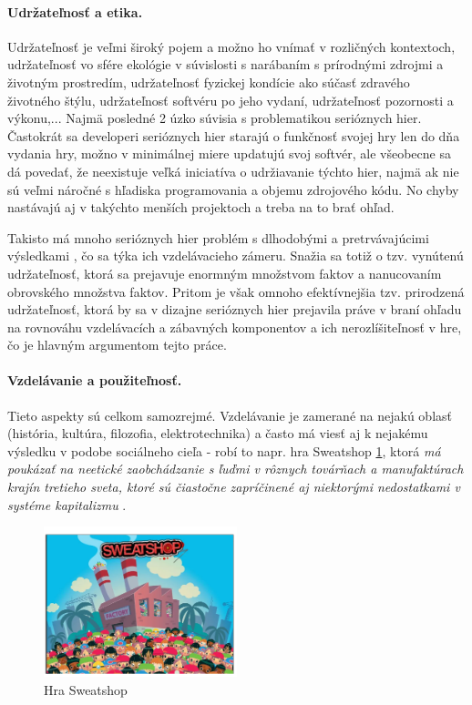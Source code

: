 \documentclass[10pt,twoside,slovak,a4paper]{article}
\begin{document}
\paragraph{Udržateľnosť a etika.} Udržateľnosť je veľmi široký pojem a možno ho vnímať v rozličných kontextoch, udržateľnosť vo sfére ekológie v súvislosti s narábaním s prírodnými zdrojmi a životným prostredím, udržateľnosť fyzickej kondície ako súčasť zdravého životného štýlu, udržateľnosť softvéru po jeho vydaní, udržateľnosť pozornosti a výkonu,... Najmä posledné 2 úzko súvisia s problematikou serióznych hier. Častokrát sa developeri serióznych hier starajú o funkčnosť svojej hry len do dňa vydania hry, možno v minimálnej miere updatujú svoj softvér, ale všeobecne sa dá povedať, že neexistuje veľká iniciatíva o udržiavanie týchto hier, najmä ak nie sú veľmi náročné s hľadiska programovania a objemu zdrojového kódu. No chyby nastávajú aj v takýchto menších projektoch a treba na to brať ohľad.

Takisto má mnoho serióznych hier problém s dlhodobými a pretrvávajúcimi výsledkami , čo sa týka ich vzdelávacieho zámeru. Snažia sa totiž o tzv. vynútenú udržateľnosť, ktorá sa prejavuje enormným množstvom faktov a nanucovaním obrovského množstva faktov. Pritom je však omnoho efektívnejšia tzv. prirodzená udržateľnosť, ktorá by sa v dizajne serióznych hier prejavila práve v braní ohľadu na rovnováhu vzdelávacích a zábavných komponentov a ich nerozlíšiteľnosť v hre, čo je hlavným argumentom tejto práce.
\paragraph{Vzdelávanie a použiteľnosť.} Tieto aspekty sú celkom samozrejmé. Vzdelávanie je zamerané na nejakú oblasť (história, kultúra, filozofia, elektrotechnika) a často má viesť aj k nejakému výsledku v podobe sociálneho cieľa - robí to napr. hra Sweatshop \ref{fig:game}, ktorá \emph{má poukázať na neetické zaobchádzanie s ľuďmi v rôznych továrňach a manufaktúrach krajín tretieho sveta, ktoré sú čiastočne zapríčinené aj niektorými nedostatkami v systéme kapitalizmu} \cite{mitgutsch2012purposeful}.
\begin{figure}[h]
\centering
\includegraphics[width = 0.5\textwidth]{sweatshop.png}
\caption{Hra Sweatshop}
\label{fig:game}
\end{figure}
\end{document}
